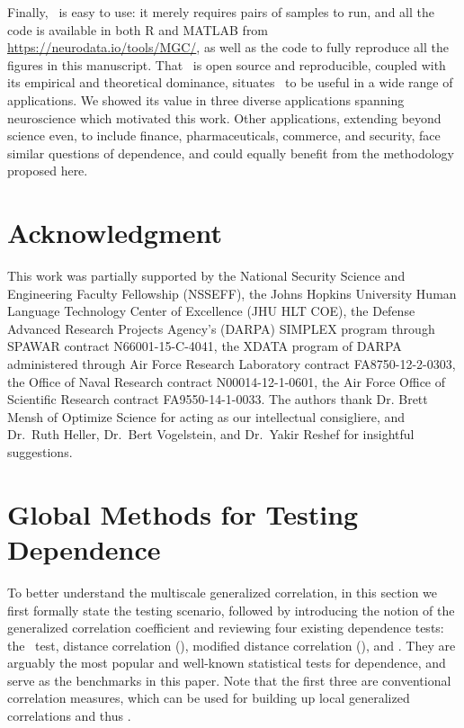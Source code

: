 \documentclass[11pt]{article}
\begin{document}
 

Finally, \Mgc~is easy to use: it merely requires pairs of samples to run, and all the code is available in both R and MATLAB from \url{https://neurodata.io/tools/MGC/}, as well as the code to fully reproduce all the figures in this manuscript.  That \Mgc~is open source and reproducible, coupled with its empirical and theoretical dominance, situates \Mgc~to be useful in a wide range of applications.  We showed its value in three diverse applications spanning neuroscience which motivated this work. Other applications, extending beyond science even, to include finance, pharmaceuticals, commerce, and security, face similar questions of dependence, and could equally benefit from the methodology proposed here.   


\clearpage
\pagestyle{empty}




\section*{Acknowledgment}
This work was partially supported by the
%
National Security Science and Engineering Faculty Fellowship (NSSEFF),
%
the Johns Hopkins University Human Language Technology Center of Excellence (JHU HLT COE),  the
%
Defense Advanced Research Projects Agency's (DARPA) SIMPLEX program through SPAWAR contract N66001-15-C-4041,
%
the XDATA program of DARPA administered through Air Force Research Laboratory contract FA8750-12-2-0303,
%
the Office of Naval Research contract N00014-12-1-0601,
%
the Air Force Office of Scientific Research contract FA9550-14-1-0033. The authors thank Dr. Brett Mensh of Optimize Science for acting as our intellectual consigliere, and Dr.~Ruth Heller, Dr.~Bert Vogelstein,  and Dr.~Yakir Reshef for insightful suggestions.


\clearpage
\appendix
\setcounter{figure}{0}
\renewcommand{\thealgorithm}{C\arabic{algorithm}}
\renewcommand{\thefigure}{E\arabic{figure}}
\renewcommand{\thesubsection}{\thesection.\Roman{subsection}}
\renewcommand{\thesubsubsection}{\thesubsection.\arabic{subsubsection}}

\section{Global Methods for Testing Dependence}
\label{appen:global}
To better understand the multiscale generalized correlation, in this section we first formally state the testing scenario, followed by introducing the notion of the generalized correlation coefficient and reviewing four existing dependence tests: the \Mantel~test, distance correlation (\Dcorr), modified distance correlation (\Mcorr), and \Hhg. They are arguably the most popular and well-known statistical tests for dependence, and serve as the benchmarks in this paper. Note that the first three are conventional correlation measures, which can be used for building up local generalized correlations and thus  \Mgc.
\end{document}
